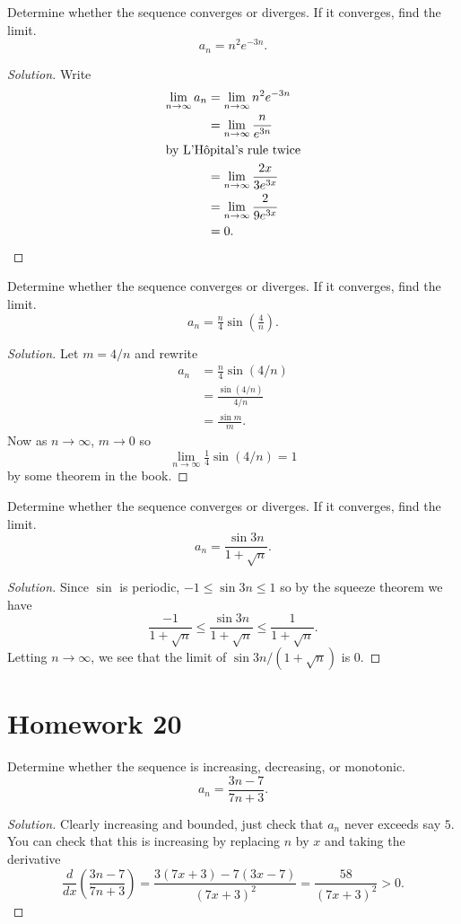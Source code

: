 \begin{problem}[HW 19, \# 9]
Determine whether the sequence converges or diverges. If it converges, find
the limit.
\[
a_n=n^2e^{-3n}.
\]
\end{problem}
\begin{proof}[Solution]
Write
\begin{align*}
\lim_{n\to\infty }a_n&=\lim_{n\to\infty} n^2e^{-3n}\\
   &=\lim_{n\to\infty}\frac{n}{e^{3n}}\\
\shortintertext{by L'Hôpital's rule twice}
   &=\lim_{n\to\infty}\frac{2x}{3e^{3x}}\\
   &=\lim_{n\to\infty}\frac{2}{9e^{3x}}\\
   &=0.
\end{align*}
\end{proof}

\begin{problem}[HW 19, \# 10]
Determine whether the sequence converges or diverges. If it converges, find
the limit.
\[
a_n=\tfrac{n}{4}\sin\left(\tfrac{4}{n}\right).
\]
\end{problem}
\begin{proof}[Solution]
Let $m=4/n$ and rewrite
\begin{align*}
a_n&=\tfrac{n}{4}\sin\left(4/n\right)\\
   &=\frac{\sin(4/n)}{4/n}\\
   &=\frac{\sin m}{m}.
\end{align*}
Now as $n\to\infty$, $m\to 0$ so
\[
  \lim_{n\to\infty}\tfrac{1}{4}\sin(4/n)=1
\]
by some theorem in the book.
\end{proof}

\begin{problem}[HW 19, \# 11]
Determine whether the sequence converges or diverges. If it converges, find
the limit.
\[
a_n=\frac{\sin 3n}{1+\sqrt{n}}.
\]
\end{problem}
\begin{proof}[Solution]
Since $\sin$ is periodic, $-1\leq \sin 3n\leq 1$ so by the squeeze theorem we
have
\[
\frac{-1}{1+\sqrt{n}}\leq\frac{\sin 3n}{1+\sqrt{n}}\leq\frac{1}{1+\sqrt{n}}.
\]
Letting $n\to\infty$, we see that the limit of $\sin 3n/(1+\sqrt{n})$ is
$0$.
\end{proof}

\section{Homework 20}
\begin{problem}[HW 20, \# 1]
Determine whether the sequence is increasing, decreasing, or monotonic.
\[
a_n=\frac{3n-7}{7n+3}.
\]
\end{problem}
\begin{proof}[Solution]
Clearly increasing and bounded, just check that $a_n$ never exceeds say
$5$. You can check that this is increasing by replacing $n$ by $x$ and
taking the derivative
\[
\frac{d}{dx}\left(\frac{3n-7}{7n+3}\right)=
\frac{3(7x+3)-7(3x-7)}{(7x+3)^2}=\frac{58}{(7x+3)^2}>0.
\]
\end{proof}

